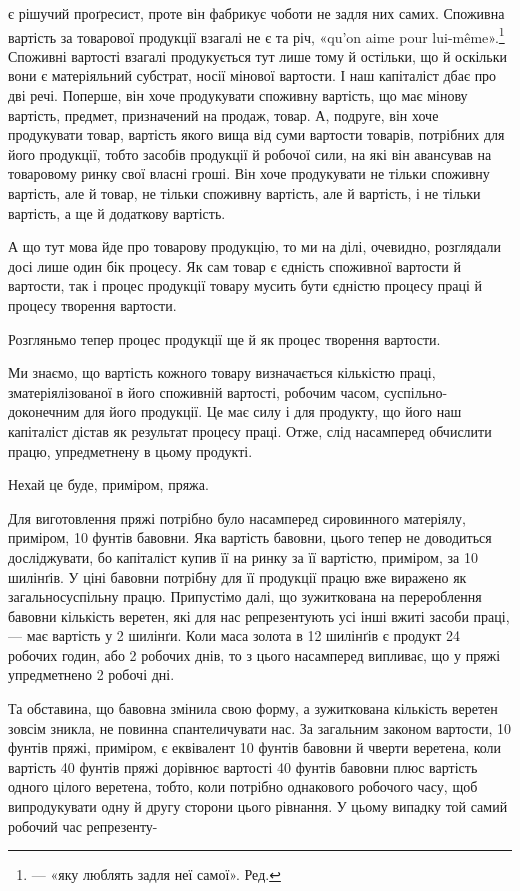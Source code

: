 є рішучий проґресист, проте він фабрикує чоботи не задля них
самих. Споживна вартість за товарової продукції взагалі не є
та річ, «qu’on aime pour lui-même».\footnote*{
— «яку люблять задля неї самої». Ред.
} Споживні вартості взагалі
продукується тут лише тому й остільки, що й оскільки вони є
матеріяльний субстрат, носії мінової вартости. І наш капіталіст
дбає про дві речі. Поперше, він хоче продукувати споживну
вартість, що має мінову вартість, предмет, призначений на продаж,
товар. А, подруге, він хоче продукувати товар, вартість
якого вища від суми вартости товарів, потрібних для його продукції,
тобто засобів продукції й робочої сили, на які він авансував
на товаровому ринку свої власні гроші. Він хоче продукувати
не тільки споживну вартість, але й товар, не тільки споживну
вартість, але й вартість, і не тільки вартість, а ще й додаткову
вартість.

А що тут мова йде про товарову продукцію, то ми на ділі,
очевидно, розглядали досі лише один бік процесу. Як сам товар
є єдність споживної вартости й вартости, так і процес продукції
товару мусить бути єдністю процесу праці й процесу творення
вартости.

Розгляньмо тепер процес продукції ще й як процес творення
вартости.

Ми знаємо, що вартість кожного товару визначається кількістю
праці, зматеріялізованої в його споживній вартості, робочим
часом, суспільно-доконечним для його продукції. Це має силу
і для продукту, що його наш капіталіст дістав як результат процесу
праці. Отже, слід насамперед обчислити працю, упредметнену
в цьому продукті.

Нехай це буде, приміром, пряжа.

Для виготовлення пряжі потрібно було насамперед сировинного
матеріялу, приміром, 10 фунтів бавовни. Яка вартість бавовни,
цього тепер не доводиться досліджувати, бо капіталіст
купив її на ринку за її вартістю, приміром, за 10 шилінґів. У ціні
бавовни потрібну для її продукції працю вже виражено як загальносуспільну
працю. Припустімо далі, що зужиткована на
перероблення бавовни кількість веретен, які для нас репрезентують
усі інші вжиті засоби праці, — має вартість у 2 шилінґи.
Коли маса золота в 12 шилінґів є продукт 24 робочих годин, або
2    робочих днів, то з цього насамперед випливає, що у пряжі упредметнено
2 робочі дні.

Та обставина, що бавовна змінила свою форму, а зужиткована
кількість веретен зовсім зникла, не повинна спантеличувати
нас. За загальним законом вартости, 10 фунтів пряжі, приміром,
є еквівалент 10 фунтів бавовни й чверти веретена, коли вартість
40 фунтів пряжі дорівнює вартості 40 фунтів бавовни плюс вартість
одного цілого веретена, тобто, коли потрібно однакового
робочого часу, щоб випродукувати одну й другу сторони цього
рівнання. У цьому випадку той самий робочий час репрезенту-